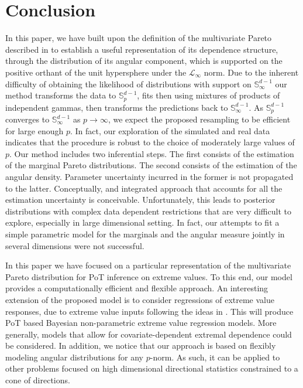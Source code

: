 \section{Conclusion\label{sec:conclusion}}
In this paper, we have built upon the definition of the multivariate Pareto 
    described in \cite{ferreira2014} to establish a useful representation of 
    its dependence structure, through the distribution of its angular component,
    which is supported on the positive orthant of the unit hypersphere under 
    the $\mathcal{L}_{\infty}$ norm.  Due to the inherent difficulty of 
    obtaining the likelihood of distributions with support on ${\mathbb S}^{d-1}_\infty$ 
    our method transforms the data to ${\mathbb S}_{p}^{d-1}$, fits then using mixtures of 
    products of independent gammas, then transforms the predictions back to 
    ${\mathbb S}^{d-1}_\infty$. As ${\mathbb S}_{p}^{d-1}$ converges to 
    ${\mathbb S}_{\infty}^{d-1}$ as  $p\to\infty$, we expect the proposed 
    resampling to be efficient for large enough $p$. In fact, our exploration 
    of the simulated and real data indicates that the procedure is robust to 
    the choice of moderately large values of $p$. 
    Our method includes two inferential steps. The first consists of the
    estimation of the marginal Pareto distributions. The second consists 
    of the estimation of the angular density. Parameter uncertainty incurred in
    the former is not propagated to the latter. Conceptually, and integrated approach 
    that accounts for all the estimation uncertainty is conceivable. Unfortunately, 
    this leads to posterior distributions with complex data dependent restrictions 
    that  are very difficult to explore, especially in large dimensional setting. In 
    fact, our attempts to fit a simple parametric model for the marginals and the
    angular measure jointly in several dimensions were not successful.

In this paper we have focused on a particular representation of the multivariate
    Pareto distribution for PoT inference on extreme values. To this end, our model 
    provides a computationally efficient and flexible approach. An interesting extension 
    of the proposed model is to consider regressions of extreme value responses, due
    to extreme value inputs following the ideas in  \cite{carvalho2022}. This will 
    produce PoT based Bayesian non-parametric extreme value regression models. More 
    generally,  models that allow for covariate-dependent extremal dependence 
    \citep{mhalla2019} could be considered. In addition, we notice that our approach 
    is based on flexibly  modeling angular distributions for any $p$-norm. As such, 
    it can be applied to other problems focused on high dimensional directional 
    statistics  constrained  to a cone of directions. 
 
